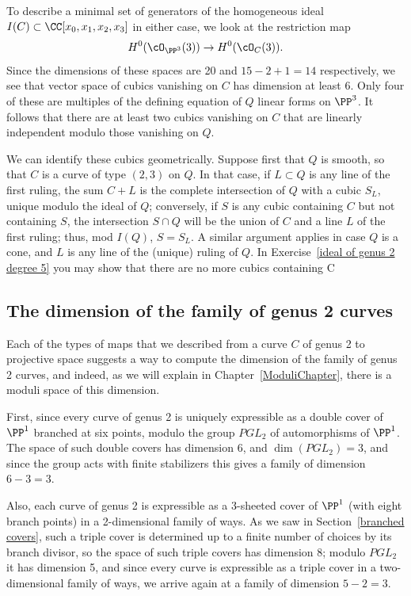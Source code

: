 To describe a minimal set of generators of the homogeneous ideal $I(C) \subset \CC[x_0, x_1, x_2, x_3]$ in either case, we look at the restriction map
$$
H^0(\cO_{\PP^3}(3)) \to H^0(\cO_C(3)).
$$
Since the dimensions of these spaces are 20 and $15-2+1 = 14$ respectively, we see that  vector space of cubics vanishing on $C$ has dimension at least 6. Only four of these are multiples of the defining equation of $Q$ linear forms on $\PP^3$. It follows that there are at least two cubics vanishing on $C$ that are linearly independent modulo those vanishing on $Q$.

We can identify these cubics geometrically. Suppose first that $Q$ is smooth, so that $C$ is a curve of type $(2,3)$ on $Q$. In that case, if $L \subset Q$ is any line of the first ruling, the sum $C+L$ is the complete intersection of $Q$ with a cubic $S_L$, unique modulo the ideal of $Q$; conversely, if $S$ is any cubic containing $C$ but not containing $S$, the intersection $S \cap Q$ will be the union of $C$ and a line $L$ of the first ruling; thus, mod $I(Q)$, $S = S_L$. A similar argument applies in case $Q$ is a cone, and $L$ is any line of the (unique) ruling of $Q$. In Exercise~\ref{ideal of genus 2 degree 5} you may show that there are no more cubics containing C

\subsection{The dimension of the family of genus 2 curves}

Each of the types of maps that we described from a curve $C$ of genus 2 to projective space suggests
a way to compute the dimension of the family of genus 2 curves, and indeed, as we will explain in Chapter~\ref{ModuliChapter}, there is a moduli space of this dimension.

First, since every curve of genus 2 is uniquely expressible as a double cover of $\PP^1$ branched at six points, modulo the group $PGL_2$ of automorphisms of $\PP^1$. The space of such double covers has dimension 6, and $\dim(PGL_2) = 3$, and since the group acts with finite stabilizers this gives a family of dimension $6-3 = 3$.

Also, each curve  of genus 2 is expressible as a 3-sheeted cover of $\PP^1$ (with eight branch points) in a 2-dimensional family of ways. As we saw in Section~\ref{branched covers}, such a triple cover is determined up to a finite number of choices by its branch divisor, so the space of such triple covers has dimension 8; modulo $PGL_2$ it has dimension 5, and since every curve is expressible as a triple cover in a two-dimensional family of ways, we arrive again at a family of dimension $ 5-2 = 3$.

